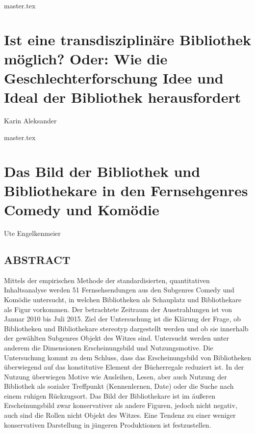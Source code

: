 \documentclass[10.5pt,a5paper,twoside]{memoir}
\makeatletter
\DeclareRobustCommand\authortoctext[1]{%
{\addvspace{20pt}\nopagebreak\leftskip0em\relax
\rightskip \@tocrmarg\relax
\noindent\itshape#1\par\addvspace{-7pt}}}
\newcommand\authortoc[1]{%
  \gdef\chapterauthor{#1}%
  \addtocontents{toc}{\authortoctext{#1}}}
\makeatother
\begin{document}
\vspace{5mm}

{master.tex}

\authortoc{Karin Aleksander}
\chapter*[Ist eine transdisziplinäre Bibliothek möglich?]{Ist eine transdisziplinäre Bibliothek möglich? Oder: Wie die Geschlechterforschung Idee und Ideal der Bibliothek herausfordert}
\begin{flushright}
{\large Karin Aleksander}
\end{flushright}

\vspace{5mm}

{master.tex}

\authortoc{Ute Engelkenmeier}
\chapter*[Bibliothek und Bibliothekare in Comedy und Komödie]{Das Bild der Bibliothek und Bibliothekare in den Fernsehgenres Comedy und Komödie}
\begin{flushright}
{\large Ute Engelkenmeier}
\end{flushright}

\vspace{5mm}

\section*{ABSTRACT}

{\small Mittels der empirischen Methode der standardisierten, quantitativen
Inhaltsanalyse werden 51 Fernsehsendungen aus den Subgenres Comedy und
Komödie untersucht, in welchen Bibliotheken als Schauplatz und
Bibliothekare als Figur vorkommen. Der betrachtete Zeitraum der
Ausstrahlungen ist von Januar 2010 bis Juli 2015. Ziel der Untersuchung
ist die Klärung der Frage, ob Bibliotheken und Bibliothekare stereotyp
dargestellt werden und ob sie innerhalb der gewählten Subgenres Objekt
des Witzes sind. Untersucht werden unter anderem die Dimensionen
Erscheinungsbild und Nutzungsmotive. Die Untersuchung kommt zu dem
Schluss, dass das Erscheinungsbild von Bibliotheken überwiegend auf das
konstitutive Element der Bücherregale reduziert ist. In der Nutzung
überwiegen Motive wie Ausleihen, Lesen, aber auch Nutzung der Bibliothek
als sozialer Treffpunkt (Kennenlernen, Date) oder die Suche nach einem
ruhigen Rückzugsort. Das Bild der Bibliothekare ist im äußeren
Erscheinungsbild zwar konservativer als andere Figuren, jedoch nicht
negativ, auch sind die Rollen nicht Objekt des Witzes. Eine Tendenz zu
einer weniger konservativen Darstellung in jüngeren Produktionen ist
festzustellen.}
\end{document}
